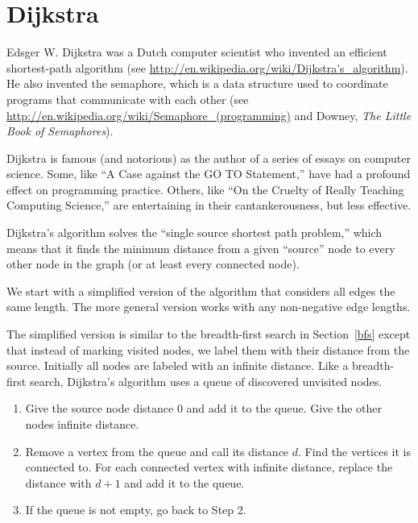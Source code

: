 \documentclass[10pt]{book}
\begin{document}
\section{Dijkstra}

Edsger W. Dijkstra was a Dutch computer scientist who invented an
efficient shortest-path algorithm (see
\url{http://en.wikipedia.org/wiki/Dijkstra's_algorithm}).  He also invented the
semaphore, which is a data structure used to coordinate programs that
communicate with each other (see
\url{http://en.wikipedia.org/wiki/Semaphore_(programming)} and Downey, {\em The
  Little Book of Semaphores}).

Dijkstra is famous (and notorious) as the author of a series
of essays on computer science.
Some, like ``A Case against the GO TO Statement,'' have
had a profound effect on programming practice.
Others, like
``On the Cruelty of Really Teaching Computing Science,'' are
entertaining in their cantankerousness, but less effective.

Dijkstra's algorithm solves the ``single source shortest path problem,''
which means that it finds the minimum distance from a given ``source''
node to every other node in the graph (or at least every connected
node).

We start with a simplified version of the algorithm that
considers all edges the same length.  The more general version
works with any non-negative edge lengths.

The simplified version is similar to the breadth-first search
in Section~\ref{bfs} except that instead of marking visited nodes,
we label them with their distance from the source.  Initially
all nodes are labeled with an infinite distance.  Like a
breadth-first search, Dijkstra's algorithm uses a queue of
discovered unvisited nodes.

\begin{enumerate}

\item Give the source node distance 0 and add it to the queue.
Give the other nodes infinite distance.

\item Remove a vertex from the queue and call its distance $d$.  Find
  the vertices it is connected to.  For each connected vertex
  with infinite distance, replace the distance with $d+1$ and
  add it to the queue.

\item If the queue is not empty, go back to Step 2.

\end{enumerate}
\end{document}
